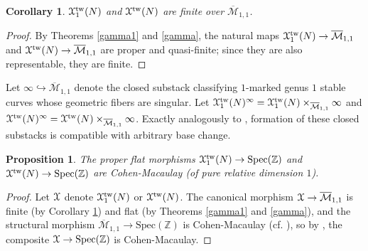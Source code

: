 \documentclass[11pt]{amsart}
\newtheorem{proposition}[subsection]{Proposition}
\newtheorem{corollary}[subsection]{Corollary}
\theoremstyle{definition}
\begin{document}
\begin{corollary}\label{finite}
${\mathbf{\EuScript{X}}}^{\mathrm{tw}}_1(N)$ and ${\mathbf{\EuScript{X}}}^{\mathrm{tw}}(N)$ are finite over $\overline{\mathcal{M}}_{1,1}$.
\end{corollary}

\begin{proof}
By Theorems \ref{gamma1} and \ref{gamma}, the natural maps ${\mathbf{\EuScript{X}}}^{\mathrm{tw}}_1(N) \rightarrow \overline{\mathcal{M}}_{1,1}$ and ${\mathbf{\EuScript{X}}}^{\mathrm{tw}}(N) \rightarrow \overline{\mathcal{M}}_{1,1}$ are proper and quasi-finite; since they are also representable, they are finite.
\end{proof}

Let $\infty \hookrightarrow \overline{\mathcal{M}}_{1,1}$ denote the closed substack classifying $1$-marked genus $1$ stable curves whose geometric fibers are singular. Let ${\mathbf{\EuScript{X}}}^{\mathrm{tw}}_1(N)^\infty = {\mathbf{\EuScript{X}}}^{\mathrm{tw}}_1(N) \times_{\overline{\mathcal{M}}_{1,1}} \infty$ and ${\mathbf{\EuScript{X}}}^{\mathrm{tw}}(N)^\infty = {\mathbf{\EuScript{X}}}^{\mathrm{tw}}(N) \times_{\overline{\mathcal{M}}_{1,1}} \infty$. Exactly analogously to \cite[2.1.12]{C}, formation of these closed substacks is compatible with arbitrary base change.

\begin{proposition}\label{CM}
The proper flat morphisms ${\mathbf{\EuScript{X}}}^{\mathrm{tw}}_1(N) \rightarrow \mathrm{Spec} (\mathbb{Z})$ and ${\mathbf{\EuScript{X}}}^{\mathrm{tw}}(N) \rightarrow \mathrm{Spec}(\mathbb{Z})$ are Cohen-Macaulay (of pure relative dimension $1$).
\end{proposition}
\begin{proof}
Let ${\mathbf{\EuScript{X}}}$ denote ${\mathbf{\EuScript{X}}}^{\mathrm{tw}}_1(N)$ or ${\mathbf{\EuScript{X}}}^{\mathrm{tw}}(N)$. The canonical morphism ${\mathbf{\EuScript{X}}} \rightarrow \overline{\mathcal{M}}_{1,1}$ is finite (by Corollary \ref{finite}) and flat (by Theorems \ref{gamma1} and \ref{gamma}), and the structural morphism $\overline{\mathcal{M}}_{1,1} \rightarrow \mathrm{Spec}(\mathbb{Z})$ is Cohen-Macaulay (cf. \cite[3.3.1]{C}), so by \cite[2.7.9, Cor. 3]{B}, the composite ${\mathbf{\EuScript{X}}} \rightarrow \mathrm{Spec}(\mathbb{Z})$ is Cohen-Macaulay.
\end{proof}
\end{document}
